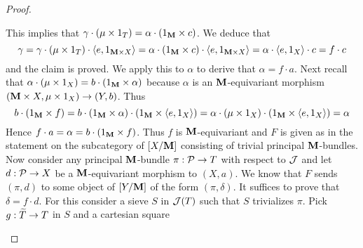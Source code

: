 \begin{proof}
\begin{center}
\end{center}
This implies that $\gamma \cdot (\mu\times 1_T) = \alpha \cdot (1_{\mathbf{M}}\times c)$. We deduce that
$$\gamma = \gamma \cdot (\mu \times 1_T)\cdot \langle e, 1_{\mathbf{M}\times X}\rangle = \alpha \cdot (1_{\mathbf{M}}\times c) \cdot  \langle e, 1_{\mathbf{M}\times X}\rangle = \alpha \cdot \langle e,1_X\rangle \cdot c = f\cdot c$$
and the claim is proved. We apply this to $\alpha$ to derive that $\alpha = f\cdot a$. Next recall that $\alpha \cdot \left(\mu \times 1_X\right) = b\cdot \left(1_{\mathbf{M}} \times \alpha \right)$ because $\alpha$ is an $\mathbf{M}$-equivariant morphism $\left(\mathbf{M}\times X, \mu\times 1_X\right)\rightarrow (Y,b)$. Thus
$$b\cdot \left(1_{\mathbf{M}}\times f\right) = b\cdot \left(1_{\mathbf{M}}\times \alpha\right)\cdot \left(1_{\mathbf{M}}\times \langle e, 1_X\rangle \right) = \alpha \cdot \left(\mu \times 1_X\right)\cdot \left(1_{\mathbf{M}}\times \langle e, 1_X\rangle \right) = \alpha$$
Hence $f\cdot a = \alpha = b\cdot \left(1_{\mathbf{M}}\times f\right)$. Thus $f$ is $\mathbf{M}$-equivariant and $F$ is given as in the statement on the subcategory of $[X/\mathbf{M}]$ consisting of trivial principal $\mathbf{M}$-bundles. Now consider any principal $\mathbf{M}$-bundle $\pi:{\mathcal P}\rightarrow T$ with respect to ${\mathcal J}$ and let $d:{\mathcal P}\rightarrow X$ be a $\mathbf{M}$-equivariant morphism to $(X,a)$. We know that $F$ sends $(\pi,d)$ to some object of $[Y/\mathbf{M}]$ of the form $(\pi,\delta)$. It suffices to prove that $\delta = f\cdot d$. For this consider a sieve $S$ in ${\mathcal J}(T)$ such that $S$ trivializes $\pi$. Pick $g:\widetilde{T}\rightarrow T$ in $S$ and a cartesian square
\begin{center}
\end{center}

\end{proof}
